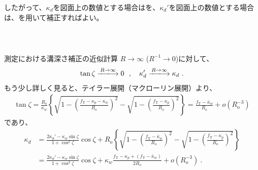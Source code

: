 したがって、$\kappa_d$を図面上の数値とする場合はを、$\kappa_d'$を図面上の数値とする場合は、を用いて補正すればよい。


\clearpage
~\vfill
\begin{Column}{測定における溝深さ補正の近似計算}
$R\to\infty$ ($R^{-1}\to0$)に対して、
\begin{align*}
  \tan\zeta \xlongrightarrow{R\to\infty} 0~~, \quad
  \kappa_d' \xlongrightarrow{R\to\infty} \kappa_d\ .
\end{align*}
もう少し詳しく見ると、テイラー展開（マクローリン展開）より、
\begin{align*}
  \tan\zeta
  = \frac{R_\mathrm o}{\kappa_w}\!
     \left\{
     \sqrt{1-\left(\frac{f_\mathrm T-\kappa_p-\kappa_w}{R_\mathrm o}\right)^{\!\!2}}
     -\sqrt{1-\left(\frac{f_\mathrm T-\kappa_p}{R_\mathrm o}\right)^{\!\!2}}
     \right\}
  = \frac{f_\mathrm T-\bar\kappa_w}{R_\mathrm o}+o\!\left(R_\mathrm o^{-3}\right)
\end{align*}
であり、
\begin{align*}
  \kappa_d
  &= \frac{2\kappa_d'-\kappa_w\sin\zeta}{1+\cos^2\zeta}\cos\zeta
     +R_\mathrm o\!
      \left\{
      \sqrt{1-\left(\frac{f_\mathrm T-\bar\kappa_w}{R_\mathrm o}\right)^{\!\!2}}
      -\sqrt{1-\left(\frac{f_\mathrm T-\kappa_p}{R_\mathrm o}\right)^{\!\!2}}
      \right\}\\
  &= \frac{2\kappa_d'-\kappa_w\sin\zeta}{1+\cos^2\zeta}\cos\zeta
     +\kappa_w\frac{f_\mathrm T-\kappa_p+(f_\mathrm T-\bar\kappa_w)}{2R_\mathrm o}+o\!\left(R_\mathrm o^{-3}\right)\ .
\end{align*}
\end{Column}






